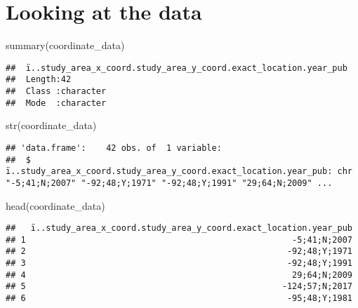 \documentclass[
]{article}
\newenvironment{Shaded}{\begin{snugshade}}{\end{snugshade}}
\newcommand{\FunctionTok}[1]{\textcolor[rgb]{0.00,0.00,0.00}{#1}}
\newcommand{\NormalTok}[1]{#1}
\begin{document}
\hypertarget{looking-at-the-data}{%
\section{Looking at the data}\label{looking-at-the-data}}

\begin{Shaded}
\begin{Highlighting}[]
\FunctionTok{summary}\NormalTok{(coordinate\_data)}
\end{Highlighting}
\end{Shaded}

\begin{verbatim}
##  ï..study_area_x_coord.study_area_y_coord.exact_location.year_pub
##  Length:42                                                       
##  Class :character                                                
##  Mode  :character
\end{verbatim}

\begin{Shaded}
\begin{Highlighting}[]
\FunctionTok{str}\NormalTok{(coordinate\_data)}
\end{Highlighting}
\end{Shaded}

\begin{verbatim}
## 'data.frame':    42 obs. of  1 variable:
##  $ ï..study_area_x_coord.study_area_y_coord.exact_location.year_pub: chr  "-5;41;N;2007" "-92;48;Y;1971" "-92;48;Y;1991" "29;64;N;2009" ...
\end{verbatim}

\begin{Shaded}
\begin{Highlighting}[]
\FunctionTok{head}\NormalTok{(coordinate\_data)}
\end{Highlighting}
\end{Shaded}

\begin{verbatim}
##   ï..study_area_x_coord.study_area_y_coord.exact_location.year_pub
## 1                                                     -5;41;N;2007
## 2                                                    -92;48;Y;1971
## 3                                                    -92;48;Y;1991
## 4                                                     29;64;N;2009
## 5                                                   -124;57;N;2017
## 6                                                    -95;48;Y;1981
\end{verbatim}
\end{document}
